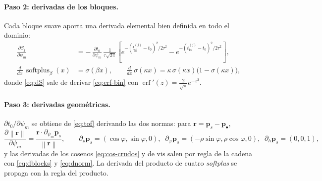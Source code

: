 \documentclass[11pt,a4paper]{article}
\theoremstyle{plain}
\theoremstyle{definition}
\newcommand{\vect}[1]{\boldsymbol{#1}}
\newcommand{\softplus}{\operatorname{softplus}}
\newcommand{\erf}{\operatorname{erf}}
\newcommand{\norm}[1]{\left\lVert #1 \right\rVert}
\begin{document}
\paragraph{Paso 2: derivadas de los bloques.} Cada bloque suave aporta una
derivada elemental bien definida en todo el dominio:
\begin{align}
    \frac{\partial S_j}{\partial\psi_m}
    &=-\,\frac{\partial t_0}{\partial\psi_m}\,
    \frac{1}{\tau\sqrt{2\pi}}
    \left[
        e^{-(t^{(j)}_{\mathrm{hi}}-t_0)^2/2\tau^2}
        -e^{-(t^{(j)}_{\mathrm{lo}}-t_0)^2/2\tau^2}
    \right],
    \label{eq:dS}\\[4pt]
    \frac{d}{dx}\,\softplus_\beta(x)&=\sigma(\beta x),
    \qquad
    \frac{d}{dx}\,\sigma(\kappa x)=\kappa\,\sigma(\kappa x)\bigl(1-\sigma(\kappa x)\bigr),
    \label{eq:dblocks}
\end{align}
donde \eqref{eq:dS} sale de derivar \eqref{eq:erf-bin} con
$\erf'(z)=\tfrac{2}{\sqrt\pi}e^{-z^2}$.

\paragraph{Paso 3: derivadas geom\'etricas.} $\partial t_0/\partial\psi_m$ se
obtiene de \eqref{eq:tof} derivando las dos normas: para $\vect r=\vect p_s-\vect
p_\bullet$,
\begin{equation}
    \frac{\partial\norm{\vect r}}{\partial\psi_m}
    =\frac{\vect r\cdot\partial_{\psi_m}\vect p_s}{\norm{\vect r}},
    \qquad
    \partial_\rho\vect p_s=(\cos\varphi,\sin\varphi,0),\;\;
    \partial_\varphi\vect p_s=(-\rho\sin\varphi,\rho\cos\varphi,0),\;\;
    \partial_h\vect p_s=(0,0,1),
    \label{eq:dnorm}
\end{equation}
y las derivadas de los cosenos \eqref{eq:cos-crudos} y de $\mathrm{vis}$ salen por
regla de la cadena con \eqref{eq:dblocks} y \eqref{eq:dnorm}. La derivada del
producto de cuatro \emph{softplus} se propaga con la regla del producto.
\end{document}

